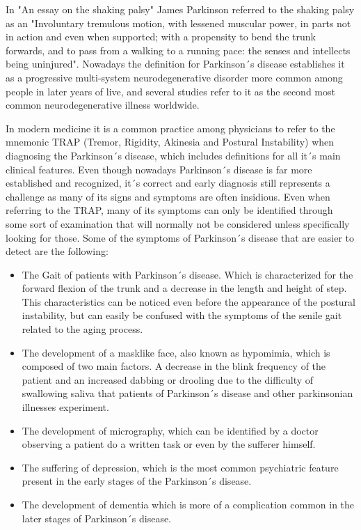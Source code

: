 \documentclass[12pt, a4paper]{article}
\begin{document}
	In "An essay on the shaking palsy" James Parkinson referred to the shaking palsy as an "Involuntary tremulous motion, with lessened muscular power, in parts not in action and even when supported; with a propensity to bend the trunk forwards, and to pass from a walking to a running pace: the senses and intellects being uninjured"\cite{parkinson2002essay}. Nowadays the definition for Parkinson´s disease establishes it as a progressive multi-system neurodegenerative disorder more common among people in later years of live, and several studies refer to it as the second most common neurodegenerative illness worldwide.\cite{sveinbjornsdottir2016clinical}
	
	In modern medicine it is a common practice among physicians to refer to the mnemonic TRAP (Tremor, Rigidity, Akinesia and Postural Instability) when diagnosing the Parkinson´s disease, which includes definitions for all it´s main clinical features. Even though nowadays Parkinson´s disease is far more established and recognized, it´s correct and early diagnosis still represents a challenge as many of its signs and symptoms are often insidious. Even when referring to the TRAP, many of its symptoms can only be identified through some sort of examination that will normally not be considered unless specifically looking for those. Some of the symptoms of Parkinson´s disease that are easier to detect are the following:\cite{frank2006approach}
	
	\begin{itemize}
		
		\item The Gait of patients with Parkinson´s disease. Which is characterized for the forward flexion of the trunk and a decrease in the length and height of step. This characteristics can be noticed even before the appearance of the postural instability, but can easily be confused with the symptoms of the senile gait related to the aging process.
		
		\item The development of a masklike face, also known as hypomimia, which is composed of two main factors. A decrease in the blink frequency of the patient and an increased dabbing or drooling due to the difficulty of swallowing saliva that patients of Parkinson´s disease and other parkinsonian illnesses experiment.
		
		\item The development of micrography, which can be identified by a doctor observing a patient do a written task or even by the sufferer himself.
		
		\item The suffering of depression, which is the most common psychiatric feature present in the early stages of the Parkinson´s disease.
		
		\item The development of dementia which is more of a complication common in  the later stages of Parkinson´s disease.
		
	\end{itemize}
		
\end{document}
